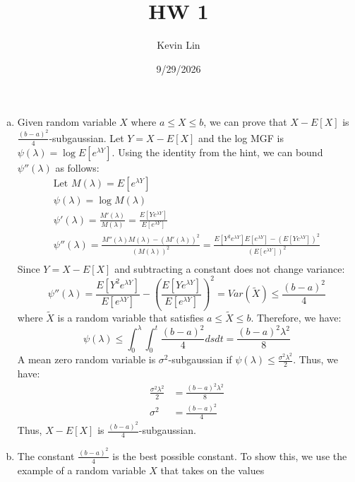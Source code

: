 \documentclass[11pt,a4paper,margin=1in]{article}
\title{HW 1}
\author{Kevin Lin}
\date{9/29/2026}
\begin{document}
\maketitle

\section{}
\begin{enumerate}[(a)]
    \item Given random variable $X$ where $a \leq X \leq b$, we can prove that 
    $X - E[X]$ is $\frac{(b-a)^2}{4}$-subgaussian. Let $Y = X - E[X]$ and the
    log MGF is $\psi(\lambda) = \log E[e^{\lambda Y}]$. Using the identity from 
    the hint, we can bound $\psi''(\lambda)$ as follows:
    \begin{gather*}
        \text{Let } M(\lambda) = E[e^{\lambda Y}] \\
        \psi(\lambda) = \log M(\lambda) \\
        \psi'(\lambda) = \frac{M'(\lambda)}{M(\lambda)} = \frac{E[Y e^{\lambda Y}]}{E[e^{\lambda Y}]} \\
        \psi''(\lambda) = \frac{M''(\lambda) M(\lambda) - (M'(\lambda))^2}{(M(\lambda))^2} = \frac{E[Y^2 e^{\lambda Y}] E[e^{\lambda Y}] - (E[Y e^{\lambda Y}])^2}{(E[e^{\lambda Y}])^2} \\
    \end{gather*}
    Since $Y = X - E[X]$ and subtracting a constant does not change variance:
    \[
        \psi''(\lambda) = \frac{E[Y^2 e^{\lambda Y}]}{E[e^{\lambda Y}]} -
        \left( \frac{E[Y e^{\lambda Y}]}{E[e^{\lambda Y}]} \right)^2 = Var(\tilde{X}) \leq \frac{(b-a)^2}{4}
    \]
    where $\tilde{X}$ is a random variable that satisfies $a \leq \tilde{X} \leq b$.
    Therefore, we have:
    \[
        \psi(\lambda) \leq \int_0^\lambda \int_0^t \frac{(b-a)^2}{4} ds dt = \frac{(b-a)^2 \lambda^2}{8}
    \]
    A mean zero random variable is $\sigma^2$-subgaussian if $\psi(\lambda) \leq \frac{\sigma^2 \lambda^2}{2}$. 
    Thus, we have:
    \begin{align*}
        \frac{\sigma^2 \lambda^2}{2} &= \frac{(b-a)^2 \lambda^2}{8} \\
        \sigma^2 &= \frac{(b-a)^2}{4}
    \end{align*}
    Thus, $X - E[X]$ is $\frac{(b-a)^2}{4}$-subgaussian.
    \item The constant $\frac{(b-a)^2}{4}$ is the best possible constant. To show
    this, we use the example of a random variable $X$ that takes on the values 

\end{enumerate}
\end{document}
